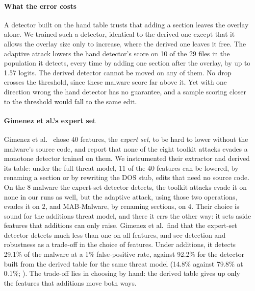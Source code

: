 \paragraph{What the error costs}
A detector built on the hand table trusts that adding a section leaves the overlay alone. We trained such a detector, identical to the derived one except that it allows
the overlay size only to increase, where the derived one leaves it free. The adaptive attack lowers the hand detector's score on 10 of the 29 files in the population it detects, every time by
adding one section after the overlay, by up to 1.57 logits. The derived detector cannot be moved on any of them. No drop
crosses the threshold, since these malware score far above it. Yet with one direction wrong the hand detector has no
guarantee, and a sample scoring closer to the threshold would fall to the same edit.

\paragraph{Gimenez et al.'s expert set}
Gimenez et al.~\cite{gimenez2025certifiably} chose 40 features, the \emph{expert set}, to be hard to lower without the
malware's source code, and report that none of the eight toolkit attacks evades a monotone detector trained on them. We
instrumented their extractor and derived its table: under the full threat model, 11 of the 40 features can be lowered,
by renaming a section or by rewriting the DOS stub, edits that need no source code. On the 8 malware the expert-set
detector detects, the toolkit attacks evade it on none in our runs as well, but the adaptive attack, using those two
operations, evades it on 2, and MAB-Malware, by renaming sections, on 4. Their choice is sound for the additions threat
model, and there it errs the other way: it sets aside features that additions can only raise. Gimenez et al.\ find that the expert-set detector detects much less than one on
all features, and see detection and robustness as a trade-off in the choice of features. Under additions, it detects
29.1\% of the malware at a 1\% false-positive rate, against 92.2\% for the detector built from the derived table for
the same threat model (14.8\% against 79.8\% at 0.1\%; ). The trade-off lies in choosing by
hand: the derived table gives up only the features that additions move both ways.

